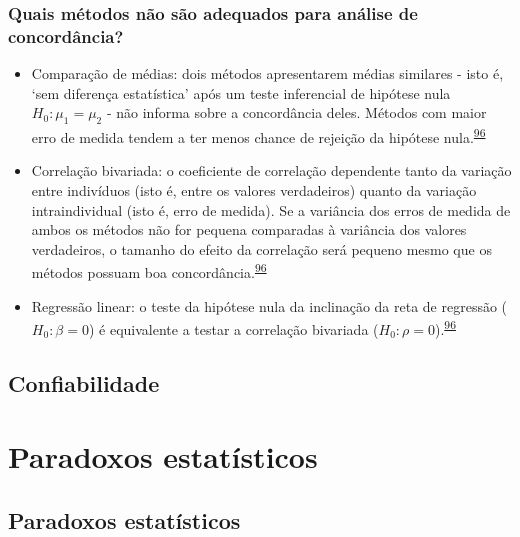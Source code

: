 \documentclass[
]{book}
\begin{document}
\hypertarget{quais-muxe9todos-nuxe3o-suxe3o-adequados-para-anuxe1lise-de-concorduxe2ncia}{%
\subsection{Quais métodos não são adequados para análise de concordância?}\label{quais-muxe9todos-nuxe3o-suxe3o-adequados-para-anuxe1lise-de-concorduxe2ncia}}

\begin{itemize}
\item
  Comparação de médias: dois métodos apresentarem médias similares - isto é, `sem diferença estatística' após um teste inferencial de hipótese nula \(H_{0}:\mu_{1} = \mu_{2}\) - não informa sobre a concordância deles. Métodos com maior erro de medida tendem a ter menos chance de rejeição da hipótese nula.\textsuperscript{\protect\hyperlink{ref-altman1983}{96}}
\item
  Correlação bivariada: o coeficiente de correlação dependente tanto da variação entre indivíduos (isto é, entre os valores verdadeiros) quanto da variação intraindividual (isto é, erro de medida). Se a variância dos erros de medida de ambos os métodos não for pequena comparadas à variância dos valores verdadeiros, o tamanho do efeito da correlação será pequeno mesmo que os métodos possuam boa concordância.\textsuperscript{\protect\hyperlink{ref-altman1983}{96}}
\item
  Regressão linear: o teste da hipótese nula da inclinação da reta de regressão (\(H_{0}:\beta = 0\)) é equivalente a testar a correlação bivariada (\(H_{0}:\rho = 0\)).\textsuperscript{\protect\hyperlink{ref-altman1983}{96}}
\end{itemize}

\hypertarget{confiabilidade}{%
\section{Confiabilidade}\label{confiabilidade}}

\hypertarget{paradoxos-estatisticos}{%
\chapter{\texorpdfstring{\textbf{Paradoxos estatísticos}}{Paradoxos estatísticos}}\label{paradoxos-estatisticos}}

\hypertarget{paradoxos}{%
\section{Paradoxos estatísticos}\label{paradoxos}}
\end{document}
